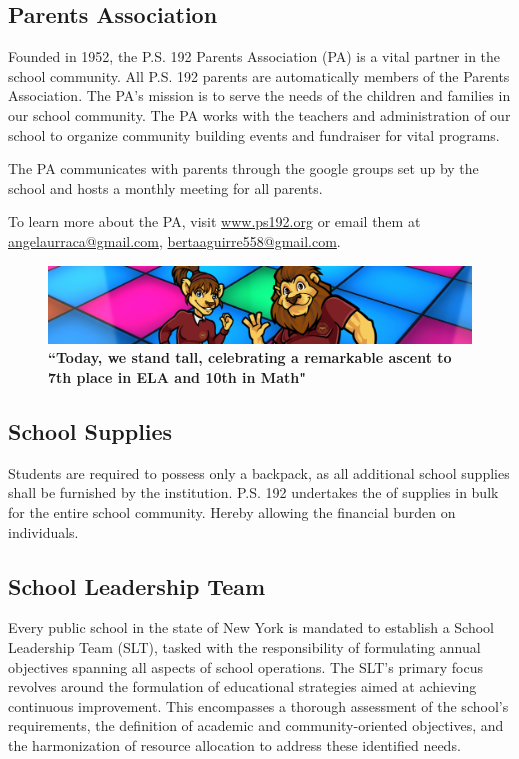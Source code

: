 \documentclass[11pt, letterpaper]{article}
\begin{document}
\subsection{Parents Association} 
Founded in 1952, the P.S. 192 Parents Association (PA) is a vital partner in the school community. All P.S. 192 parents are automatically members of the Parents Association. The PA’s mission is to serve the needs of the children and families in our school community. The PA works with the teachers and administration of our school to organize community building events and fundraiser for vital programs.

The PA communicates with parents through the google groups set up by the school and hosts a monthly meeting for all parents.

To learn more about the PA, visit \href{https://www.ps192.org}{www.ps192.org} or email them at \href{angelaurraca@gmail.com}{angelaurraca@gmail.com}, \href{bertaaguirre558@gmail.com}{bertaaguirre558@gmail.com}.

\begin{figure}[H]
  \centering
\includegraphics[width=1\linewidth]{5.png}
\caption{\textbf{“Today, we stand tall, celebrating a remarkable ascent to 7th place in ELA and 10th in Math"}}
  \label{fig:school success}
\end{figure}

\subsection{School Supplies}
Students are required to possess only a backpack, as all additional school supplies shall be furnished by the institution. P.S. 192 undertakes the  of supplies in bulk for the entire school community. Hereby allowing the financial burden on individuals.

\subsection{School Leadership Team}
Every public school in the state of New York is mandated to establish a School Leadership Team (SLT), tasked with the responsibility of formulating annual objectives spanning all aspects of school operations. The SLT's primary focus revolves around the formulation of educational strategies aimed at achieving continuous improvement. This encompasses a thorough assessment of the school's requirements, the definition of academic and community-oriented objectives, and the harmonization of resource allocation to address these identified needs.
\end{document}
